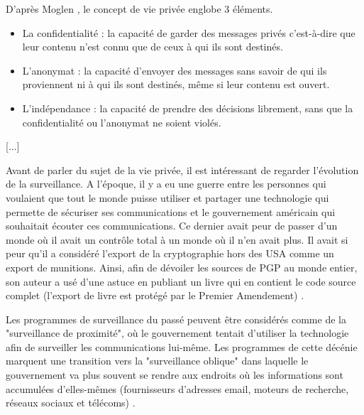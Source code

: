 D'après Moglen \cite{Moglen_part2}, le concept de vie privée englobe 3 éléments.
\begin{itemize}
  \item La confidentialité : la capacité de garder des messages privés c'est-à-dire que leur contenu n'est connu que de ceux à qui ils sont destinés.
  \item L'anonymat : la capacité d'envoyer des messages sans savoir de qui ils proviennent ni à qui ils sont destinés, même si leur contenu est ouvert.
  \item L'indépendance : la capacité de prendre des décisions librement, sans que la confidentialité ou l'anonymat ne soient violés.
  \newline
\end{itemize}

[...]

Avant de parler du sujet de la vie privée, il est intéressant de regarder l'évolution de la surveillance.
A l'époque, il y a eu une guerre entre les personnes qui voulaient que tout le monde puisse utiliser et partager une technologie qui permette de sécuriser ses communications et le gouvernement américain qui souhaitait écouter ces communications. Ce dernier avait peur de passer d'un monde où il avait un contrôle total à un monde où il n'en avait plus. Il avait si peur qu'il a considéré l'export de la cryptographie hors des USA comme un export de munitions. Ainsi, afin de dévoiler les sources de PGP au monde entier, son auteur a usé d'une astuce en publiant un livre qui en contient le code source complet (l'export de livre est protégé par le Premier Amendement) \cite{youtube_moxie_marlinspike}.
\newline

Les programmes de surveillance du passé peuvent être considérés comme de la "surveillance de proximité", où le gouvernement tentait d'utiliser la technologie afin de surveiller les communications lui-même. Les programmes de cette décénie marquent une transition vers la "surveillance oblique" dans laquelle le gouvernement va plus souvent se rendre aux endroits où les informations sont accumulées d'elles-mêmes (fournisseurs d'adresses email, moteurs de recherche, réseaux sociaux et télécoms) \cite{wired_nothing_to_hide}.
\newline

